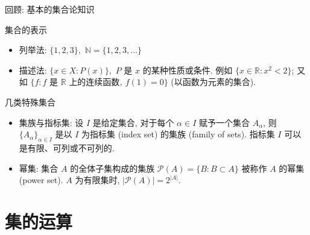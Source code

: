 \begin{frame}{回顾: 基本的集合论知识}

\begin{block}{集合的表示}
\begin{itemize}
\item \alert{列举法}: $\{1, 2, 3\},$ $\mathbb{N} = \{1, 2, 3, \ldots\}$
\item \alert{描述法}: $\{x \in X : P(x)\},$ $P$ 是 $x$ 的某种性质或条件. 例如 $\{x \in \mathbb{R} : x^2 < 2\}$; 又如 $\{f : f \text{ 是 } \mathbb{R} \text{ 上的连续函数},\ f(1) = 0\}$ (以函数为元素的集合).
\end{itemize}
\end{block}

\pause
\vspace{0.5em}

\begin{block}{几类特殊集合}
\begin{itemize}
\item \alert{集族与指标集}: 设 $I$ 是给定集合, 对于每个 $\alpha \in I$ 赋予一个集合 $A_\alpha$, 则 $\{A_\alpha\}_{\alpha \in I}$ 是以 $I$ 为指标集 (index set) 的集族 (family of sets). 指标集 $I$ 可以是有限、可列或不可列的.
\item \alert{幂集}: 集合 $A$ 的全体子集构成的集族 $\mathscr{P}(A) = \{B : B \subset A\}$ 被称作 $A$ 的幂集 (power set). $A$ 为有限集时, $|\mathscr{P}(A)| = 2^{|A|}$.
\end{itemize}
\end{block}

\end{frame}


\section{集的运算}


